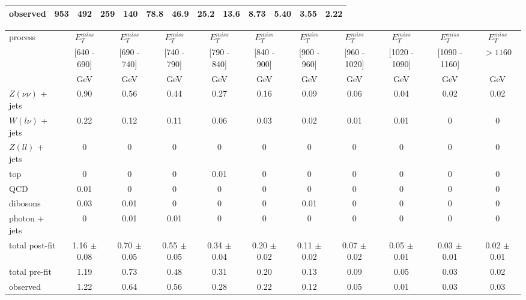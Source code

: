 \begin{landscape}
\begin{table}[ht]
\begin{subtable}{}
\begin{tabular}{| l | c | c | c | c | c | c | c | c | c | c | c | c |}
\hline
\hline
  observed & 953 & 492 & 259 & 140 & 78.8 & 46.9 & 25.2 & 13.6 & 8.73 & 5.40 & 3.55 & 2.22\\
\hline
\end{tabular}
\end{subtable}
\vspace*{.5cm}
\begin{subtable}{}
\renewcommand{\arraystretch}{1.2}
\begin{tabular}{| l | c | c | c | c | c | c | c | c | c | c |}
\hline
\multirow{3}{*}{process} &  $E_T^{miss}$ &  $E_T^{miss}$ &  $E_T^{miss}$ &  $E_T^{miss}$ &  $E_T^{miss}$ &  $E_T^{miss}$ &  $E_T^{miss}$ &  $E_T^{miss}$ &  $E_T^{miss}$ &  $E_T^{miss}$  \\
 & [640 - 690] & [690 - 740] & [740 - 790] & [790 - 840] & [840 - 900] & [900 - 960] & [960 - 1020] & [1020 - 1090] & [1090 - 1160] & $> 1160$  \\
 & GeV & GeV & GeV & GeV & GeV & GeV & GeV & GeV & GeV & GeV \\
\hline
  $Z(\nu\nu)$ + jets & 0.90 & 0.56 & 0.44 & 0.27 & 0.16 & 0.09 & 0.06 & 0.04 & 0.02 & 0.02\\
  $W(l\nu)$ + jets & 0.22 & 0.12 & 0.11 & 0.06 & 0.03 & 0.02 & 0.01 & 0.01 & 0 & 0\\
  $Z(ll)$ + jets & 0 & 0 & 0 & 0 & 0 & 0 & 0 & 0 & 0 & 0\\
  top & 0 & 0 & 0 & 0.01 & 0 & 0 & 0 & 0 & 0 & 0\\
  QCD & 0.01 & 0 & 0 & 0 & 0 & 0 & 0 & 0 & 0 & 0\\
  dibosons & 0.03 & 0.01 & 0 & 0 & 0 & 0.01 & 0 & 0 & 0 & 0\\
  photon + jets  & 0 & 0.01 & 0.01 & 0 & 0 & 0 & 0 & 0 & 0 & 0\\
\hline
  total post-fit & 1.16 $\pm$ 0.08 & 0.70 $\pm$ 0.05 & 0.55 $\pm$ 0.05 & 0.34 $\pm$ 0.04 & 0.20 $\pm$ 0.02 & 0.11 $\pm$ 0.02 & 0.07 $\pm$ 0.02 & 0.05 $\pm$ 0.01 & 0.03 $\pm$ 0.01 & 0.02 $\pm$ 0.01\\
\hline
  total pre-fit  & 1.19 & 0.73 & 0.48 & 0.31 & 0.20 & 0.13 & 0.09 & 0.05 & 0.03 & 0.02\\
\hline
\hline
  observed & 1.22 & 0.64 & 0.56 & 0.28 & 0.22 & 0.12 & 0.05 & 0.01 & 0.03 & 0.03 \\
\hline
\end{tabular}
\end{subtable}
\end{table}

\end{landscape}

